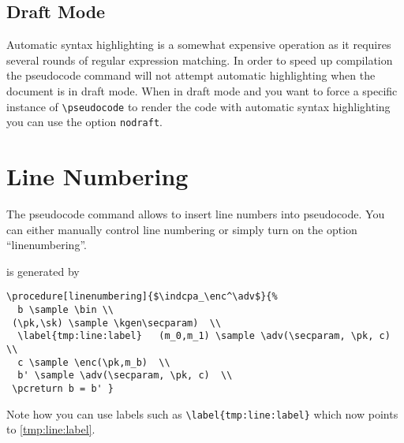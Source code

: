 \documentclass[a4paper]{report}
\begin{document}
\subsection{Draft Mode}
Automatic syntax highlighting is a somewhat expensive operation as it requires several rounds of regular expression matching.
In order to speed up compilation the pseudocode command will not attempt automatic highlighting when the document is in draft mode.
When in draft mode and you want to force a specific instance of \lstinline$\pseudocode$ to render the code with automatic syntax
highlighting you can use the option \lstinline$nodraft$.


\section{Line Numbering}
The pseudocode command allows to insert line numbers into pseudocode. You can either manually control line numbering or simply turn on the option
\enquote{linenumbering}.
\begin{center}
\end{center}
is generated by
\begin{lstlisting}
\procedure[linenumbering]{$\indcpa_\enc^\adv$}{%
  b \sample \bin \\
 (\pk,\sk) \sample \kgen\secparam)  \\
  \label{tmp:line:label}   (m_0,m_1) \sample \adv(\secparam, \pk, c)  \\
  c \sample \enc(\pk,m_b)  \\
  b' \sample \adv(\secparam, \pk, c)  \\
 \pcreturn b = b' }
\end{lstlisting}
Note how you can use labels such as \lstinline$\label{tmp:line:label}$ which now points to \ref{tmp:line:label}.
\end{document}
